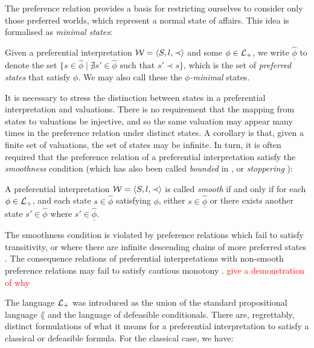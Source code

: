 The preference relation provides a basis for restricting ourselves to consider only those preferred worlds, which represent
a normal state of affairs. This idea is formalised as \textit{minimal states}:

\begin{definition}
	\label{definition:state-minimal}

	Given a preferential interpretation $\mathcal{W} = \langle S,l,\prec \rangle$ and some $\phi \in \mathcal{L}_+$, we write $\underline{\hat{\phi}}$ to denote the set
	$\{s \in \hat{\phi}\mid \nexists s' \in \hat{\phi}\text{ such that }s' \prec s \}$, which is the set of \textit{preferred
	states} that satisfy $\phi$. We may also call these the \textit{$\phi$-minimal} states.
\end{definition}

It is necessary to stress the distinction between states in a preferential interpretation and valuations. There is no requirement
that the mapping from states to valuations be injective, and so the same valuation may appear many times in the
preference relation under distinct states. A corollary is that, given a finite set of valuations, the set of states may be
infinite. In turn, it is often required that the preference relation of a preferential interpretation satisfy the \textit{smoothness}
condition (which has also been called \textit{bounded} in \cite{shohamSemanticApproach}, or \textit{stoppering}
\cite{makinson2003bridges}):

\begin{definition}
	\label{definition:smoothness} 

	A preferential interpretation $\mathcal{W} = \langle S,l,\prec \rangle$ is called \textit{smooth} if and only if for each $\phi \in \mathcal{L}_+$, and each
	state $s \in \hat{\phi}$ satisfying $\phi$, either $s \in \underline{\hat{\phi}}$ or there exists another state $s' \in
	\hat{\phi}$ where $s' \in \underline{\hat{\phi}}$.
\end{definition}

The smoothness condition is violated by preference relations which fail to satisfy transitivity, or where there are infinite
descending chains of more preferred states \cite{Schlechta1996}. The consequence relations of preferential
interpretations with non-smooth preference relations may fail to satisfy cautious monotony
\cite{kraus1990nonmonotonic,makinson2003bridges}. \textcolor{red}{give a demonstration of why}

The language $\mathcal{L}_+$ was introduced as the union of the standard propositional language $\lang$ and the language of defeasible
conditionals. There are, regrettably, distinct formulations of what it means for a preferential interpretation to
satisfy a classical or defeasible formula. For the classical case, we have:

